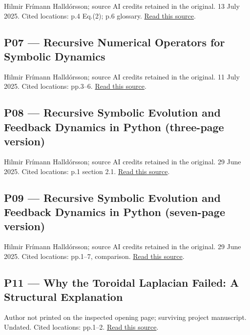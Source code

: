 \documentclass[11pt,a4paper]{article}
\begin{document}
Hilmir Frímann Halldórsson; source AI credits retained in the original. 13 July 2025. Cited locations: p.4 Eq.(2); p.6 glossary. \href{https://zenodo.org/records/15872156/files/dark_energy.pdf}{Read this source}.


\subsection*{P07 --- Recursive Numerical Operators for Symbolic Dynamics}

Hilmir Frímann Halldórsson; source AI credits retained in the original. 11 July 2025. Cited locations: pp.3--6. \href{https://github.com/pzychozen/trioctagon-physics/blob/26a3f666c3082144e37fa08b752d5221053dd3bc/SRG_REDISCOVERY/PAPERS/SRG_I_FOUNDATIONAL_RECONSTRUCTION/publication/v0.1.1/sources/P07_Recursive_Numerical_Operators.pdf}{Read this source}.


\subsection*{P08 --- Recursive Symbolic Evolution and Feedback Dynamics in Python (three-page version)}

Hilmir Frímann Halldórsson; source AI credits retained in the original. 29 June 2025. Cited locations: p.1 section 2.1. \href{https://zenodo.org/records/15770001/files/Recursive\%20Symbolic\%20Evolution\%201.pdf}{Read this source}.


\subsection*{P09 --- Recursive Symbolic Evolution and Feedback Dynamics in Python (seven-page version)}

Hilmir Frímann Halldórsson; source AI credits retained in the original. 29 June 2025. Cited locations: pp.1--7, comparison. \href{https://zenodo.org/records/15770001/files/Recursive\%20Symbolic\%20Evolution\%20and\%20Feedback\%20Dynamics\%20in\%20python.pdf}{Read this source}.


\subsection*{P11 --- Why the Toroidal Laplacian Failed: A Structural Explanation}

Author not printed on the inspected opening page; surviving project manuscript. Undated. Cited locations: pp.1--2. \href{https://zenodo.org/records/15770001/files/Toroidal\%20Laplacian\%20Failure.pdf}{Read this source}.
\end{document}
